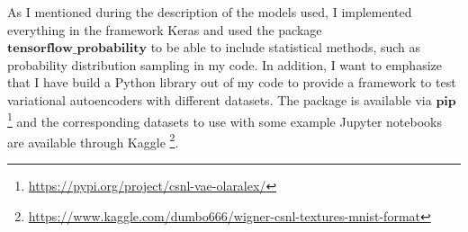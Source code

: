 \documentclass[11pt, english]{article}
\begin{document}
\vspace{3mm}

\par As I mentioned during the description of the models used, I implemented everything in the framework Keras and used the package $\bm{tensorflow\_probability}$ to be able to include statistical methods, such as probability distribution sampling in my code. In addition, I want to emphasize that I have build a Python library out of my code to provide a framework to test variational autoencoders with different datasets. The package is available via $\bm{pip}$ \footnote{\url{https://pypi.org/project/csnl-vae-olaralex/}} and the corresponding datasets to use with some example Jupyter notebooks are available through Kaggle \footnote{\url{https://www.kaggle.com/dumbo666/wigner-csnl-textures-mnist-format}}.

\newpage
\printbibliography
\end{document}
